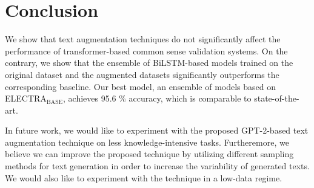 \documentclass[10pt, a4paper]{article}
\begin{document}
\section{Conclusion}
 We show that text augmentation techniques do not significantly affect the performance of transformer-based common sense validation systems. On the contrary, we show that the ensemble of BiLSTM-based models trained on the original dataset and the augmented datasets significantly outperforms the corresponding baseline. Our best model, an ensemble of models based on ELECTRA$_\text{BASE}$, achieves 95.6 \% accuracy, which is comparable to state-of-the-art.

In future work, we would like to experiment with the proposed GPT-2-based text augmentation technique on less knowledge-intensive tasks. Furtheremore, we believe we can improve the proposed technique by utilizing different sampling methods for text generation in order to increase the variability of generated texts. We would also like to experiment with the technique in a low-data regime.



\newpage\newpage


 
\end{document}
